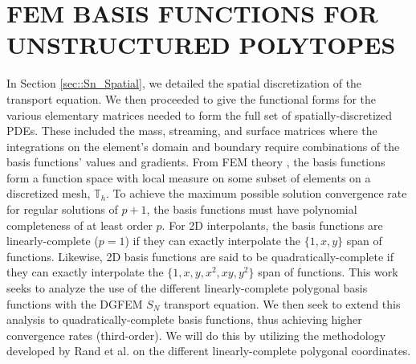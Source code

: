 %
%
%
\chapter{\uppercase {FEM Basis Functions for Unstructured Polytopes}}
\label{sec::BF}


In Section \ref{sec::Sn_Spatial}, we detailed the spatial discretization of the transport equation. We then proceeded to give the functional forms for the various elementary matrices needed to form the full set of spatially-discretized PDEs. These included the mass, streaming, and surface matrices where the integrations on the element's domain and boundary require combinations of the basis functions' values and gradients. From FEM theory \cite{ern2013theory}, the basis functions form a function space with local measure on some subset of elements on a discretized mesh, $\mathbb{T}_h$. To achieve the maximum possible solution convergence rate for regular solutions of $p+1$, the basis functions must have polynomial completeness of at least order $p$. For 2D interpolants, the basis functions are linearly-complete ($p=1$) if they can exactly interpolate the $\{ 1, x, y \}$ span of functions. Likewise, 2D basis functions are said to be quadratically-complete if they can exactly interpolate the $\{ 1, x, y, x^2, xy, y^2 \}$ span of functions. This work seeks to analyze the use of the different linearly-complete polygonal basis functions with the DGFEM $S_N$ transport equation. We then seek to extend this analysis to quadratically-complete basis functions, thus achieving higher convergence rates (third-order). We will do this by utilizing the methodology developed by Rand et al. \cite{rand2014quadratic} on the different linearly-complete polygonal coordinates.

